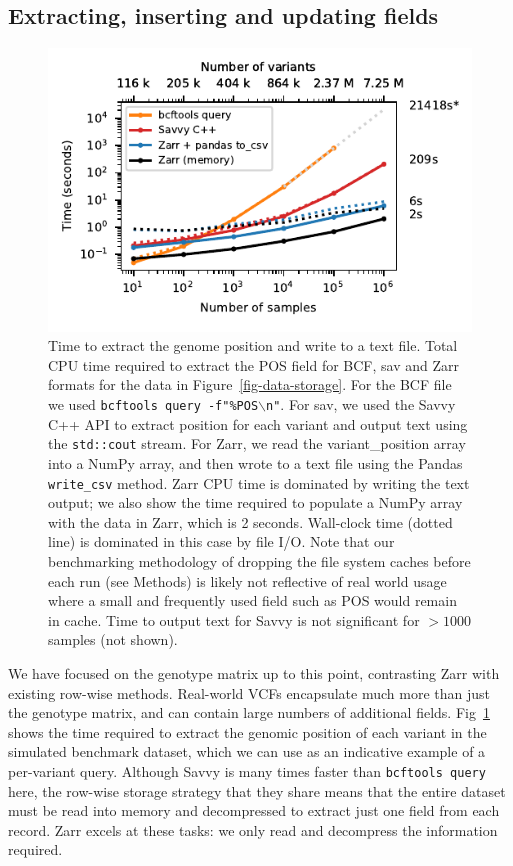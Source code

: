 \documentclass[a4paper,num-refs]{oup-contemporary}
\begin{document}
\subsection{Extracting, inserting and updating fields}
\begin{figure}
\includegraphics{figures/column-extract}
\caption{Time to extract the genome position and write to a text file.
Total CPU time required to extract the POS field for BCF,
sav and Zarr formats
for the data in Figure~\ref{fig-data-storage}.
For the BCF file we used \texttt{bcftools query -f"\%POS$\backslash$n"}.
For sav, we used the Savvy C++ API to extract position for each variant
and output text using the \texttt{std::cout} stream. For Zarr, we read
the variant\_position array into a NumPy array, and then wrote to
a text file using the Pandas \texttt{write\_csv} method.
Zarr CPU time is dominated by writing the text output; we also show
the time required to populate a NumPy array with the data in Zarr,
which is 2 seconds. Wall-clock time (dotted line) is dominated
in this case by file I/O. Note that our benchmarking methodology of
dropping the file system caches before each run (see Methods) is
likely not reflective of real world usage where a small and
frequently used field such as POS would remain in cache.
Time to output text for Savvy is not significant
for $> 1000$ samples (not shown).
\label{fig-column-extract}}
\end{figure}
We have focused on the genotype matrix up to this point, contrasting
Zarr with existing row-wise methods.
Real-world VCFs encapsulate much more than just the genotype
matrix, and can contain large numbers of additional fields.
Fig~\ref{fig-column-extract} shows the time required to extract
the genomic position of each variant in the simulated benchmark
dataset, which we can use as an indicative example of a per-variant
query. Although Savvy is many times faster than \texttt{bcftools query}
here, the row-wise storage strategy that they share means that
the entire dataset must be read into memory and
decompressed to extract just one field from each record. Zarr
excels at these tasks: we only read and decompress the information required.
\end{document}

